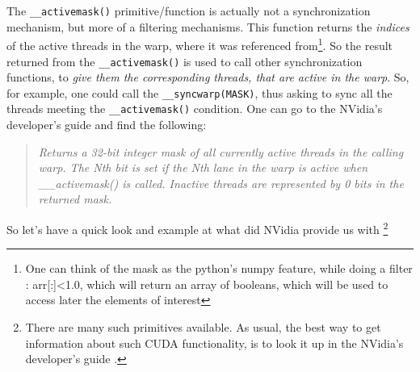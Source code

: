 The \verb|__activemask()| primitive/function is actually not a synchronization 
mechanism, but more of a filtering mechanisms. This function returns the \textit{indices}
of the active threads in the warp, where it was referenced from\footnote{One can think 
of the mask as the python's numpy feature, while doing a filter : {\selectfont arr[:]<1.0}, which 
will return an array of booleans, which will be used to access later the elements of interest}. 
So the result returned from the \verb|__activemask()| is used to call other synchronization functions, 
to \textit{give them the corresponding threads, that are active in the warp}.
So, for example, one could call the  \verb|__syncwarp(MASK)|, thus asking 
to sync all the threads meeting the \verb|__activemask()| condition. 
One can go to the NVidia's developer's guide \cite{center} and find the following:

\begin{quote}
    \textsl{
Returns a 32-bit integer mask of all currently active threads in the calling warp. 
The Nth bit is set if the Nth lane in the warp is active when \_\_activemask() is called. 
Inactive threads are represented by 0 bits in the returned mask.
    }
\end{quote}

So let's have a quick look and example at what did NVidia provide us with 
\footnote{There are many such primitives available. As usual, the best way to get information about such 
CUDA functionality, is to look it up in the NVidia's developer's guide \cite{center}.}

